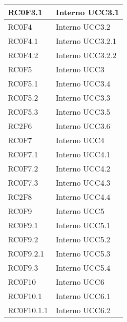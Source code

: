 \begin{center}
\begin{longtable}{|p{5cm}|p{5cm}|}
RC0F3.1		& Interno \newline UCC3.1 \\\hline
RC0F4		& Interno \newline UCC3.2 \\\hline
RC0F4.1		& Interno \newline UCC3.2.1 \\\hline
RC0F4.2		& Interno \newline UCC3.2.2 \\\hline
RC0F5		& Interno \newline UCC3 \\\hline
RC0F5.1		& Interno \newline UCC3.4 \\\hline
RC0F5.2		& Interno \newline UCC3.3 \\\hline
RC0F5.3		& Interno \newline UCC3.5 \\\hline
RC2F6		& Interno \newline UCC3.6 \\\hline
RC0F7		& Interno \newline UCC4 \\\hline
RC0F7.1		& Interno \newline UCC4.1 \\\hline
RC0F7.2		& Interno \newline UCC4.2 \\\hline
RC0F7.3		& Interno \newline UCC4.3 \\\hline
RC2F8		& Interno \newline UCC4.4 \\\hline
RC0F9		& Interno \newline UCC5 \\\hline
RC0F9.1		& Interno \newline UCC5.1 \\\hline
RC0F9.2		& Interno \newline UCC5.2 \\\hline
RC0F9.2.1	& Interno \newline UCC5.3 \\\hline
RC0F9.3		& Interno \newline UCC5.4 \\\hline
RC0F10		& Interno \newline UCC6 \\\hline
RC0F10.1	& Interno \newline UCC6.1 \\\hline
RC0F10.1.1	& Interno \newline UCC6.2 \\\hline

\end{longtable}
\end{center}
